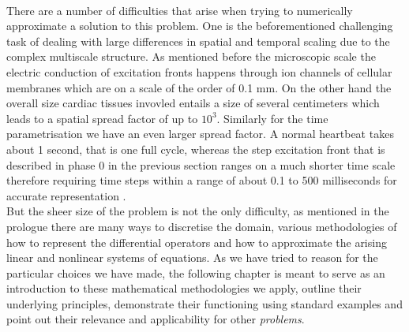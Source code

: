 \documentclass[../draft_1.tex]{subfiles}
\begin{document}
\smallskip
\\
There are a number of difficulties that arise when trying to numerically approximate a solution to this problem. One is the beforementioned challenging task of dealing with large differences in spatial and temporal scaling due to the complex multiscale structure. As mentioned before the microscopic scale the electric conduction of excitation fronts happens through ion channels of cellular membranes which are on a scale of the order of 0.1 mm. On the other hand the overall size cardiac tissues invovled entails a size of several centimeters which leads to a spatial spread factor of up to $10^3$. Similarly for the time parametrisation we have an even larger spread factor. A normal heartbeat takes about 1 second, that is one full cycle, whereas the step excitation front that is described in phase 0 in the previous section ranges on a much shorter time scale therefore requiring time steps within a range of about 0.1 to 500 milliseconds for accurate representation \cite{colli2004parallel}.
\smallskip
\\
But the sheer size of the problem is not the only difficulty, as mentioned in the prologue there are many ways to discretise the domain, various methodologies of how to represent the differential operators and how to approximate the arising linear and nonlinear systems of equations. As we have tried to reason for the particular choices we have made, the following chapter is meant to serve as an introduction to these mathematical methodologies we apply, outline their underlying principles, demonstrate their functioning using standard examples and point out their relevance and applicability for other \textit{problems}.
\end{document}
